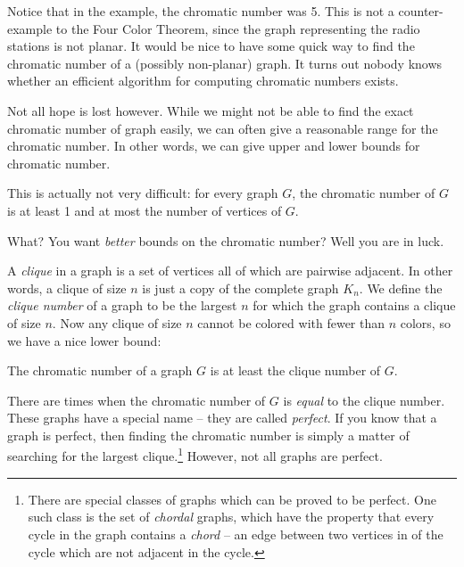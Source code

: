 \documentclass[12pt]{article}
\begin{document}
%
%

Notice that in the example, the chromatic number was 5.  This is not a counter-example to the Four Color Theorem, since the graph representing the radio stations is not planar.  It would be nice to have some quick way to find the chromatic number of a (possibly non-planar) graph.  It turns out nobody knows whether an efficient algorithm for computing chromatic numbers exists.  

Not all hope is lost however.  While we might not be able to find the exact chromatic number of graph easily, we can often give a reasonable range for the chromatic number.  In other words, we can give upper and lower bounds for chromatic number.

This is actually not very difficult: for every graph $G$, the chromatic number of $G$ is at least 1 and at most the number of vertices of $G$.  

What?  You want \emph{better} bounds on the chromatic number?  Well you are in luck.

A \emph{clique} in a graph is a set of vertices all of which are pairwise adjacent.  In other words, a clique of size $n$ is just a copy of the complete graph $K_n$.  We define the \emph{clique number} of a graph to be the largest $n$ for which the graph contains a clique of size $n$.  Now any clique of size $n$ cannot be colored with fewer than $n$ colors, so we have a nice lower bound:

\begin{theorem}
The chromatic number of a graph $G$ is at least the clique number of $G$.
\end{theorem}

There are times when the chromatic number of $G$ is \emph{equal} to the clique number.  These graphs have a special name -- they are called \emph{perfect}.  If you know that a graph is perfect, then finding the chromatic number is simply a matter of searching for the largest clique.\footnote{There are special classes of graphs which can be proved to be perfect.  One such class is the set of \emph{chordal} graphs, which have the property that every cycle in the graph contains a \emph{chord} -- an edge between two vertices in of the cycle which are not adjacent in the cycle.}  However, not all graphs are perfect.  
\end{document}
